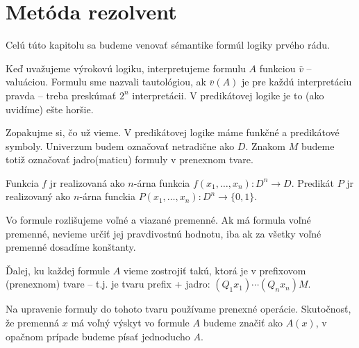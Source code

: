 \section{Metóda rezolvent}

Celú túto kapitolu sa budeme venovať sémantike formúl logiky prvého
rádu.

Keď uvažujeme výrokovú logiku, interpretujeme formulu $A$ funkciou
$\bar{v}$ -- valuáciou.
Formulu sme nazvali tautológiou, ak $\bar{v}(A)$ je pre každú
interpretáciu pravda -- treba preskúmať $2^n$ interpretácii.
V predikátovej logike je to (ako uvidíme) ešte horšie.

Zopakujme si, čo už vieme. V predikátovej logike máme funkčné a
predikátové symboly. Univerzum budem označovať netradične ako $D$.
Znakom $M$ budeme totiž označovať jadro(maticu) formuly v prenexnom
tvare.

Funkcia $f$ jr realizovaná ako $n$-árna funkcia 
$f(x_1,\dots,x_n): D^n \rightarrow D$.
Predikát $P$ jr realizovaný ako $n$-árna funckia
$P(x_1,\dots,x_n): D^n \rightarrow \{0,1\}$.

Vo formule rozlišujeme voľné a viazané premenné.
Ak má formula voľné premenné, nevieme určiť jej pravdivostnú hodnotu,
iba ak za všetky voľné premenné dosadíme konštanty.

Ďalej, ku každej formule $A$ vieme zostrojiť takú,
ktorá je v prefixovom (prenexnom) tvare -- t.j. je tvaru
prefix + jadro: $(Q_1 x_1)\cdots(Q_n x_n)M$.

Na upravenie formuly do tohoto tvaru používame prenexné operácie.
Skutočnosť, že premenná $x$ má voľný výskyt vo formule $A$ budeme
značiť ako $A(x)$, v opačnom prípade budeme písať jednoducho $A$.

